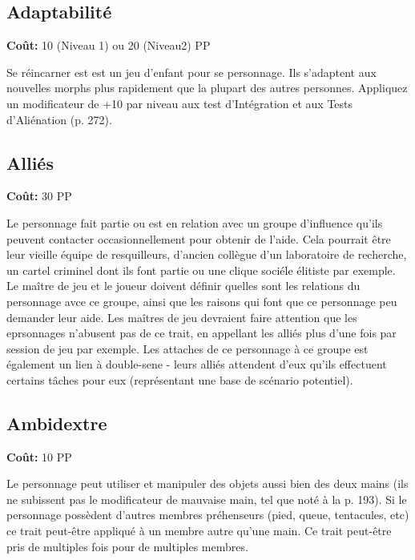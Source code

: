 \subsection{Adaptabilité} \label{sec:traits-adaptability} 

\textbf{Coût:} 10 (Niveau 1) ou 20 (Niveau2) PP 

Se réincarner est est un jeu d'enfant pour se personnage. Ils s'adaptent aux nouvelles morphs plus rapidement que la plupart des autres personnes. Appliquez un modificateur de +10 par niveau aux test d'Intégration et aux Tests d'Aliénation (p. 272). 

\subsection{Alliés} \label{sec:traits-allies} 

\textbf{Coût:} 30 PP 

Le personnage fait partie ou est en relation avec un groupe d'influence qu'ils peuvent contacter occasionnellement pour obtenir de l'aide. Cela pourrait être leur vieille équipe de resquilleurs, d'ancien collègue d'un laboratoire de recherche, un cartel criminel dont ils font partie ou une clique sociéle élitiste par exemple. Le maître de jeu et le joueur doivent définir quelles sont les relations du personnage avce ce groupe, ainsi que les raisons qui font que ce personnage peu demander leur aide. Les maîtres de jeu devraient faire attention que les eprsonnages n'abusent pas de ce trait, en appellant les alliés plus d'une fois par session de jeu par exemple. Les attaches de ce personnage à ce groupe est également un lien à double-sene - leurs alliés attendent d'eux qu'ils effectuent certains tâches pour eux (représentant une base de scénario potentiel). 

\subsection{Ambidextre} \label{sec:traits-ambidextrous} 

\textbf{Coût:} 10 PP 

Le personnage peut utiliser et manipuler des objets aussi bien des deux mains (ils ne subissent pas le modificateur de mauvaise main, tel que noté à la p. 193). Si le personnage possèdent d'autres membres préhenseurs (pied, queue, tentacules, etc) ce trait peut-être appliqué à un membre autre qu'une main. Ce trait peut-être pris de multiples fois pour de multiples membres. 

